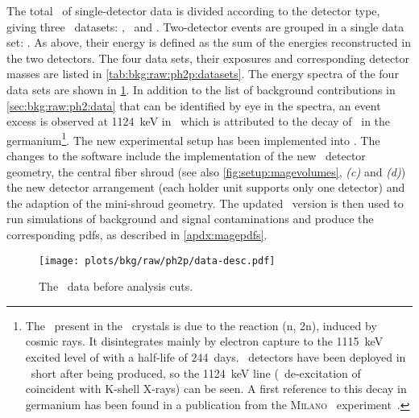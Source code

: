 The total \gexpophasetwopbkg\ of single-detector data is divided according to the detector
type, giving three \Mone\ datasets: \enrBEGeIIp, \enrSCoaxIIp\ and \enrICoaxIIp.
Two-detector events are grouped in a single data set: \enrGeIIp. As above, their energy is
defined as the sum of the energies reconstructed in the two detectors. The four data sets,
their exposures and corresponding detector masses are listed in
\cref{tab:bkg:raw:ph2p:datasets}. The
energy spectra of the four data sets are shown in \cref{fig:bkg:raw:ph2p:data-desc}. In
addition to the list of background contributions in \cref{sec:bkg:raw:ph2:data} that can
be identified by eye in the spectra, an event excess is observed at 1124~keV in
\enrICoaxIIp\ which is attributed to the decay of \Zn\ in the germanium\footnote{%
  The \Zn\ present in the \icoax\ crystals is due to the reaction (n,
  \a{}2n)\Zn, induced by cosmic rays. It disintegrates mainly by electron capture to the
  1115~keV excited level of  with a half-life of 244~days. \icoax\ detectors
  have been deployed in \gerda\ short after being produced, so the 1124~keV line (\g\
  de-excitation of  coincident with K-shell X-rays) can be seen. A first
  reference to this decay in germanium has been found in a publication from the
  \textsc{Milano} \onbb\ experiment~\cite{Bellotti1986}.
}.
\newpar
The new experimental setup has been implemented into \mage. The changes to the software
include the implementation of the new \icoax\ detector geometry, the central fiber shroud
(see also \cref{fig:setup:magevolumes}, \emph{(c)} and \emph{(d)}) the new detector
arrangement (each holder unit supports only one detector) and the adaption of the
mini-shroud geometry. The updated \mage\ version is then used to run simulations of
background and signal contaminations and produce the corresponding pdfs, as described in
\cref{apdx:magepdfs}.

\begin{figure}
  \centering
  \texttt{[image: plots/bkg/raw/ph2p/data-desc.pdf]}
  \caption{%
    The \phasetwop\ data before analysis cuts.
  }\label{fig:bkg:raw:ph2p:data-desc}
\end{figure}

\begin{table}
  \centering
  \caption{%
    Properties of the data sets considered in this analysis. Further details about the
    \gerda\ detectors can be found in past publications~\cite{Agostini2013a,
    Agostini2018a, Miloradovic2020}. Note that the exposures for the \bege\ and \icoax\
    data sets are higher than those reported for the \onbb\ analysis~\cite{Agostini2021},
    because of additional data that that was discarded due to poor PSD detector
    performance. \fillme{check these numbers carefully}
  }\label{tab:bkg:raw:ph2p:datasets}
  \small
  
\end{table}%

